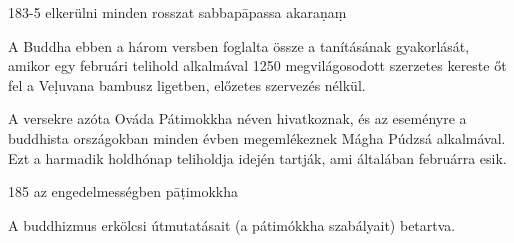 
\begin{notesdescription}

\item[{183-5}
{elkerülni minden rosszat}
{sabbapāpassa akaraṇaṃ}] \hfill\par

A Buddha ebben a három versben foglalta össze a tanításának gyakorlását, amikor egy februári telihold alkalmával 1250 megvilágosodott szerzetes kereste őt fel a Veḷuvana bambusz ligetben, előzetes szervezés nélkül.

A versekre azóta Ováda Pátimokkha néven hivatkoznak, és az eseményre a buddhista országokban minden évben megemlékeznek Mágha Púdzsá alkalmával. Ezt a harmadik holdhónap teliholdja idején tartják, ami általában februárra esik.

\item[{185}
{az engedelmességben}
{pāṭimokkha}] \hfill\par

A buddhizmus erkölcsi útmutatásait (a pátimókkha szabályait) betartva.

\end{notesdescription}

